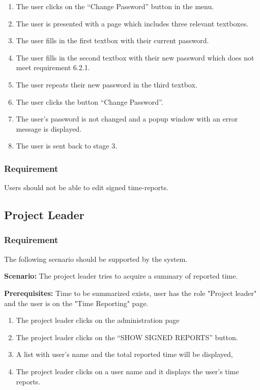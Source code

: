 \documentclass{article}
\begin{document}
\begin{enumerate}
    \item The user clicks on the “Change Password” button in the menu.
    \item The user is presented with a page which includes three relevant textboxes.
    \item The user fills in the first textbox with their current password.
    \item The user fills in the second textbox with their new password which does not meet requirement 6.2.1.
    \item The user repeats their new password in the third textbox.
    \item The user clicks the button “Change Password”.
    \item The user's password is not changed and a popup window with an error message is displayed.
    \item The user is sent back to stage 3.
\end{enumerate}

\subsubsection{Requirement}
Users should not be able to edit signed time-reports.

\subsection{Project Leader}
\subsubsection{Requirement}
The following scenario should be supported by the system.

\textbf{Scenario:} The project leader tries to acquire a summary of reported time.

\textbf{Prerequisites:} Time to be summarized exists, user has the role "Project leader" and the user is on the "Time Reporting" page.

\begin{enumerate}
    \item The project leader clicks on the administration page 
    \item The project leader clicks on the “SHOW SIGNED REPORTS” button.
    \item A list with user’s name and the total reported time will be displayed,
    \item The project leader clicks on a user name and it displays the user’s time reports.
\end{enumerate}
\end{document}
